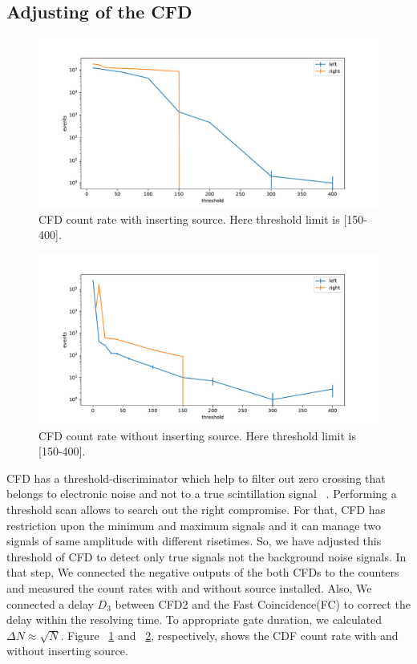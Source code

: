 \subsection{Adjusting of the CFD}
\begin{figure}[ht]
	\centering
	\includegraphics[width=0.8\linewidth]{./figs/cfd.pdf}
	\caption{CFD count rate with inserting source. Here threshold limit is [150-400]. }%
	\label{fig:Cfd1}
\end{figure}
\begin{figure}[ht]
	\centering
	\includegraphics[width=0.8\linewidth]{./figs/cfd2.pdf}
	\caption{CFD count rate without inserting source. Here threshold limit is [150-400].}%
	\label{fig:Cfd2}
\end{figure}
CFD has a threshold-discriminator which help to filter out zero crossing that belongs to electronic noise and not to a true scintillation signal ~\cite{descr}. Performing a threshold scan allows to search out the right compromise. For that, CFD has restriction upon the minimum and maximum signals and it can manage two signals of same amplitude with different risetimes.  So, we have adjusted this threshold of CFD to detect only true signals not the background noise signals. In that step, We connected the negative outputs of the both CFDs to the counters and measured the count rates with and without source installed. Also, We connected a delay $ D_{3} $ between CFD2 and the Fast Coincidence(FC) to correct the delay within the resolving time. To appropriate gate duration, we calculated $\Delta N \approx \sqrt{N}$. Figure ~\ref{fig:Cfd1} and ~\ref{fig:Cfd2}, respectively, shows the CDF count rate with and without inserting source.

